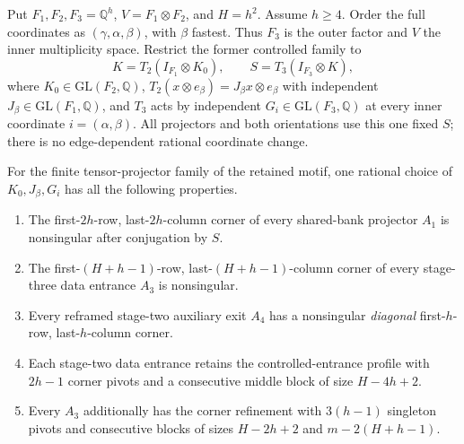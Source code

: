 Put $F_1,F_2,F_3=\mathbb Q^h$, $V=F_1\otimes F_2$, and $H=h^2$.
Assume $h\ge4$. Order the full coordinates as $(\gamma,\alpha,\beta)$,
with $\beta$ fastest. Thus $F_3$ is the outer factor and $V$ the inner
multiplicity space. Restrict the former controlled family to
\[
 K=T_2(I_{F_1}\otimes K_0),\qquad
 S=T_3(I_{F_3}\otimes K),
\]
where $K_0\in\mathrm{GL}(F_2,\mathbb Q)$,
$T_2(x\otimes e_\beta)=J_\beta x\otimes e_\beta$ with independent
$J_\beta\in\mathrm{GL}(F_1,\mathbb Q)$, and $T_3$ acts by independent
$G_i\in\mathrm{GL}(F_3,\mathbb Q)$ at every inner coordinate
$i=(\alpha,\beta)$. All projectors and both orientations use this one
fixed $S$; there is no edge-dependent rational coordinate change.

\begin{lemma}
\label{lem:nested-source-basis}
For the finite tensor-projector family of the retained motif, one rational
choice of $K_0,J_\beta,G_i$ has all the following properties.
\begin{enumerate}
\item The first-$2h$-row, last-$2h$-column corner of every shared-bank
      projector $A_1$ is nonsingular after conjugation by $S$.
\item The first-$(H+h-1)$-row, last-$(H+h-1)$-column corner of every
      stage-three data entrance $A_3$ is nonsingular.
\item Every reframed stage-two auxiliary exit $A_4$ has a nonsingular
      \emph{diagonal} first-$h$-row, last-$h$-column corner.
\item Each stage-two data entrance retains the controlled-entrance
      profile with $2h-1$ corner pivots and a consecutive middle block
      of size $H-4h+2$.
\item Every $A_3$ additionally has the corner refinement with
      $3(h-1)$ singleton pivots and consecutive blocks of sizes
      $H-2h+2$ and $m-2(H+h-1)$.
\end{enumerate}
\end{lemma}

